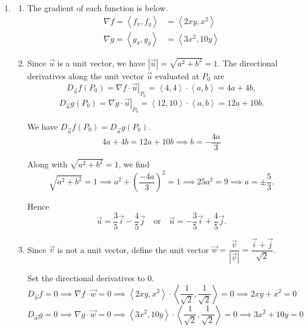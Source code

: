 \documentclass[a4paper, 12pt]{article}
\begin{document}
\begin{enumerate}[leftmargin=*,label=\textbf{\arabic*.}]
\begin{enumerate}[leftmargin=*,label=\textbf{\alph*.}]
Therefore, the parametric equations for the line $L$ is
\[\boxed{\left.\begin{array}{l}
x=2+t\\
y=4+4t\\
z=8+12t
\end{array}\right\}\quad t\in\mathbb{R}}.\]

\end{enumerate}

\item \begin{enumerate}[leftmargin=*,label=\textbf{\alph*.}]
\item The gradient of each function is below.
\[\boxed{\begin{aligned}
\nabla f=\left\langle f_x, f_y\right\rangle&=\left\langle2xy, x^2\right\rangle\\
\nabla g=\left\langle g_x, g_y\right\rangle&=\left\langle3x^2, 10y\right\rangle
\end{aligned}}
\]

\item Since $\vec u$ is a unit vector, we have $|\vec u|=\sqrt{a^2+b^2}=1$. The directional derivatives along the unit vector $\vec u$ evaluated at $P_0$ are
\[D_{\vec u}f(P_0)=\nabla f\cdot\left.\vec u\right|_{P_0}=\left\langle4,4\right\rangle\cdot\left\langle a,b\right\rangle=4a+4b,\]
\[D_{\vec u}g(P_0)=\nabla g\cdot\left.\vec u\right|_{P_0}=\left\langle12,10\right\rangle\cdot\left\langle a,b\right\rangle=12a+10b.\]

We have $D_{\vec u}f(P_0)=D_{\vec u}g(P_0)$.
\[4a+4b=12a+10b\implies b=-\frac{4a}{3}\]

Along with $\sqrt{a^2+b^2}=1$, we find
\[\sqrt{a^2+b^2}=1\implies a^2+\left(\frac{-4a}3\right)^2=1\implies25a^2=9\implies a=\pm\frac{5}{3}.\]

Hence
\[\boxed{\vec u=\frac35\vec i-\frac45\vec j\quad \text{or}\quad\vec u=-\frac35\vec i+\frac45\vec j}.\]

\item Since $\vec v$ is not a unit vector, define the unit vector $\vec w=\dfrac{\vec v}{\left|\vec v\right|}=\dfrac{\vec i+\vec j}{\sqrt2}$.

Set the directional derivatives to $0$.
\[D_{\vec w}f=0\implies \nabla f\cdot \vec w=0\implies\left\langle2xy,x^2\right\rangle\cdot\left\langle\frac1{\sqrt2},\frac1{\sqrt2}\right\rangle=0\implies2xy+x^2=0\]
\[D_{\vec w}g=0\implies \nabla g\cdot \vec w=0\implies\left\langle3x^2,10y\right\rangle\cdot\left\langle\frac1{\sqrt2},\frac1{\sqrt2}\right\rangle=0\implies3x^2+10y=0\]


\end{enumerate}
\end{enumerate}
\end{document}
